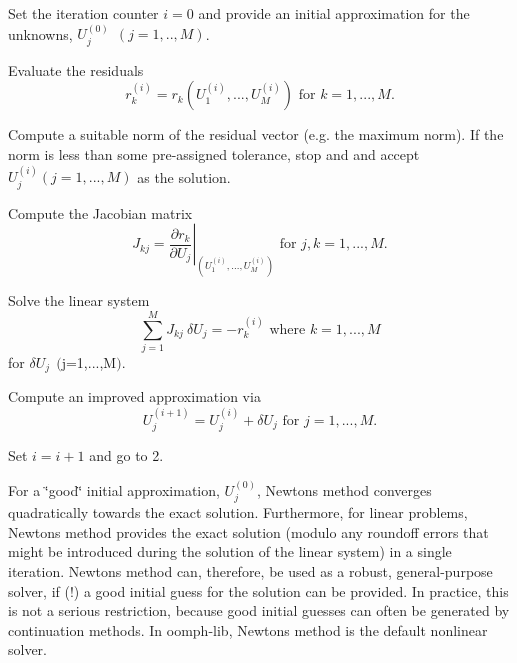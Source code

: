 \begin{DoxyEnumerate}
\item Set the iteration counter $i=0$ and provide an initial approximation for the unknowns, $ U^{(0)}_j\ \ (j=1,..,M)$.
\item Evaluate the residuals \[ r_k^{(i)} = r_k\left( U^{(i)}_1,..., U^{(i)}_M\right) \mbox{\ \ \ for $k=1,...,M$}. \]
\item Compute a suitable norm of the residual vector (e.\+g. the maximum norm). If the norm is less than some pre-\/assigned tolerance, stop and and accept $U_j^{(i)} (j=1,...,M) $ as the solution.
\item Compute the Jacobian matrix \[ J_{kj} = \left. \frac{\partial r_k}{\partial U_j} \right|_{\left( U^{(i)}_1,..., U^{(i)}_M\right)} \mbox{\ \ \ for $j,k=1,...,M$}.\]
\item Solve the linear system \[ \sum_{j=1}^{M} J_{kj} \ \delta U_j = - r_k^{(i)} \mbox{\ \ \ \ \ \ where $k=1,...,M$} \] for $ \delta U_{j} \ \ ($j=1,...,M$).$
\item Compute an improved approximation via \[ U_j^{(i+1)} = U_j^{(i)} + \delta U_j \mbox{\ \ \ for $j=1,...,M$}. \]
\item Set $ i=i+1$ and go to 2.
\end{DoxyEnumerate}For a \char`\"{}good\char`\"{} initial approximation, $ U^{(0)}_j$, Newton\textquotesingle{}s method converges quadratically towards the exact solution. Furthermore, for linear problems, Newton\textquotesingle{}s method provides the exact solution (modulo any roundoff errors that might be introduced during the solution of the linear system) in a single iteration. Newton\textquotesingle{}s method can, therefore, be used as a robust, general-\/purpose solver, if (!) a good initial guess for the solution can be provided. In practice, this is not a serious restriction, because good initial guesses can often be generated by continuation methods. In {\ttfamily oomph-\/lib}, Newton\textquotesingle{}s method is the default nonlinear solver.

